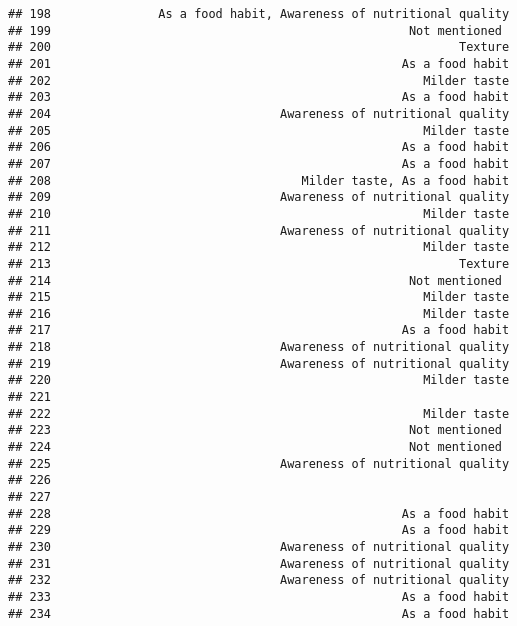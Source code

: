 \documentclass[
]{article}
\begin{document}
\begin{verbatim}
## 198               As a food habit, Awareness of nutritional quality
## 199                                                  Not mentioned 
## 200                                                         Texture
## 201                                                 As a food habit
## 202                                                    Milder taste
## 203                                                 As a food habit
## 204                                Awareness of nutritional quality
## 205                                                    Milder taste
## 206                                                 As a food habit
## 207                                                 As a food habit
## 208                                   Milder taste, As a food habit
## 209                                Awareness of nutritional quality
## 210                                                    Milder taste
## 211                                Awareness of nutritional quality
## 212                                                    Milder taste
## 213                                                         Texture
## 214                                                  Not mentioned 
## 215                                                    Milder taste
## 216                                                    Milder taste
## 217                                                 As a food habit
## 218                                Awareness of nutritional quality
## 219                                Awareness of nutritional quality
## 220                                                    Milder taste
## 221                                                                
## 222                                                    Milder taste
## 223                                                  Not mentioned 
## 224                                                  Not mentioned 
## 225                                Awareness of nutritional quality
## 226                                                                
## 227                                                                
## 228                                                 As a food habit
## 229                                                 As a food habit
## 230                                Awareness of nutritional quality
## 231                                Awareness of nutritional quality
## 232                                Awareness of nutritional quality
## 233                                                 As a food habit
## 234                                                 As a food habit

\end{verbatim}
\end{document}
